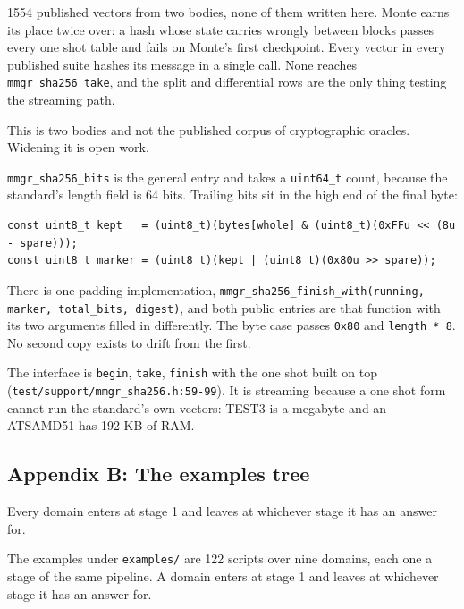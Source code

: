 1554 published vectors from two bodies, none of them written here. Monte earns its place twice over: a hash whose state carries wrongly between blocks passes every one shot table and fails on Monte's first checkpoint. Every vector in every published suite hashes its message in a single call. None reaches \texttt{mmgr\_\allowbreak{}sha256\_\allowbreak{}take}, and the split and differential rows are the only thing testing the streaming path.

This is two bodies and not the published corpus of cryptographic oracles. Widening it is open work.

\texttt{mmgr\_\allowbreak{}sha256\_\allowbreak{}bits} is the general entry and takes a \texttt{uint64\_\allowbreak{}t} count, because the standard's length field is 64 bits. Trailing bits sit in the high end of the final byte:

\begin{lstlisting}[breaklines=true,breakatwhitespace=false,basicstyle=\ttfamily\small]
const uint8_t kept   = (uint8_t)(bytes[whole] & (uint8_t)(0xFFu << (8u - spare)));
const uint8_t marker = (uint8_t)(kept | (uint8_t)(0x80u >> spare));
\end{lstlisting}

There is one padding implementation, \texttt{mmgr\_\allowbreak{}sha256\_\allowbreak{}finish\_\allowbreak{}with(running, marker, total\_\allowbreak{}bits, digest)}, and both public entries are that function with its two arguments filled in differently. The byte case passes \texttt{0x80} and \texttt{length * 8}. No second copy exists to drift from the first.

The interface is \texttt{begin}, \texttt{take}, \texttt{finish} with the one shot built on top (\texttt{test/\allowbreak{}support/\allowbreak{}mmgr\_\allowbreak{}sha256.\allowbreak{}h:59-\allowbreak{}99}). It is streaming because a one shot form cannot run the standard's own vectors: TEST3 is a megabyte and an ATSAMD51 has 192 KB of RAM.

\subsection{Appendix B: The examples tree}

Every domain enters at stage 1 and leaves at whichever stage it has an answer for.

The examples under \texttt{examples/\allowbreak{}} are 122 scripts over nine domains, each one a
stage of the same pipeline. A domain enters at stage 1 and leaves at whichever stage it has an
answer for.


